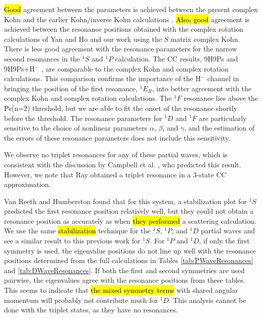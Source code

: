 \documentclass[preprint,showpacs,showkeys,preprintnumbers,amsmath,amssymb,longbibliography,pra,aps]{revtex4-1}
\begin{document}
{\hl{Good} agreement between the parameters is achieved between the present
complex Kohn and the earlier Kohn/inverse Kohn calculations 
\cite{VanReeth2003,VanReeth2004}. \hl{Also, good} agreement is achieved 
between the resonance positions obtained with the complex rotation 
calculations of Yan and Ho \cite{Yan1999,Yan1998a,Ho1998,Ho2000} and our 
work using the $S$ matrix complex Kohn. There is less good agreement with the
resonance parameters for the narrow second resonances in the $^1S$ and $^1P$
calculation. The CC results, 9H9Ps \cite{Blackwood2002} and
9H9Ps+H$^-$ \cite{Walters2004},
are comparable to the complex Kohn and complex rotation calculations. This 
comparison confirms the importance of the H$^-$ channel in bringing the 
position of the first resonance, $^1E_R$, into better agreement with the 
complex Kohn  and complex rotation calculations. The $^1F$ resonance lies above
the Ps(n=2) threshold, but we are able to fit the onset of the resonance shortly
before the threshold.
The resonance parameters for $^1D$ and $^1F$ are particularly
sensitive to the choice of nonlinear parameters $\alpha$, $\beta$, and $\gamma$,
and the estimation of the errors of these resonance parameters does not include
this sensitivity.

We observe no triplet resonances for any of these partial waves, which 
is consistent with the discussion by Campbell et al. \cite{Campbell1998}, 
who predicted this result.
However, we note that Ray \cite{Ray2006} obtained a triplet resonance in a
3-state CC approximation.

Van Reeth and Humberston \cite{VanReeth2004} found that for this 
system, a stabilization plot for $^1S$ predicted the first resonance position
relatively well, but they could not obtain a resonance position as accurately as when
\hl{they performed} a scattering calculation. We use the same \hl{stabilization}
technique for the $^1S$,
$^1P$, and $^1D$ partial waves and see a similar result to this previous work 
for $^1S$. For $^1P$ and $^1D$, if only the first symmetry is used, the 
eigenvalue positions do not line up well with the resonance positions 
determined from the full calculations in Tables \ref{tab:PWaveResonances} and 
\ref{tab:DWaveResonances}. If both the first and second symmetries are used 
pairwise, the eigenvalues agree with the resonance positions from these 
tables. This seems to indicate that \hl{the mixed symmetry terms} with shared 
angular momentum will probably not contribute much for $^1D$. This analysis
cannot be done with the triplet states, as they have no resonances.

}
\end{document}
